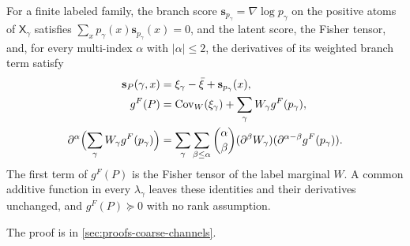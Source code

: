 \label{eq:rg-thermo-finite-branch-score}
For a finite labeled family, the branch score $\mathbf s_{p_\gamma}=\nabla\log p_\gamma$ on the
positive atoms of $\mathsf X_\gamma$ satisfies $\sum_{x}p_\gamma(x)\mathbf s_{p_\gamma}(x)=0$, and
the latent score, the Fisher tensor, and, for every multi-index $\alpha$ with
$\lvert\alpha\rvert\leq2$, the derivatives of its weighted branch term satisfy
\begin{align}
\mathbf s_P(\gamma,x)&=\xi_\gamma-\bar\xi+\mathbf s_{p_\gamma}(x),
\label{eq:rg-thermo-finite-complete-score}\\
g^F(P)&=\operatorname{Cov}_W(\xi_\gamma)+\sum_\gamma W_\gamma g^F(p_\gamma),
\label{eq:rg-thermo-finite-labeled-fisher}\\
\partial^\alpha\Bigl(\sum_\gamma W_\gamma g^F(p_\gamma)\Bigr)
&=\sum_\gamma\sum_{\beta\leq\alpha}\binom{\alpha}{\beta}
(\partial^\beta W_\gamma)(\partial^{\alpha-\beta}g^F(p_\gamma)).
\label{eq:rg-thermo-finite-weighted-fisher-derivatives}
\end{align}
The first term of $g^F(P)$ is the Fisher tensor of the label marginal $W$. A common additive
function in every $\lambda_\gamma$ leaves these identities and their derivatives unchanged, and
$g^F(P)\succeq0$ with no rank assumption. 

The proof is in \cref{sec:proofs-coarse-channels}.


